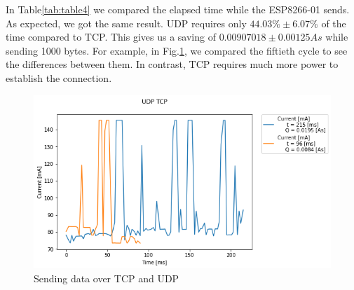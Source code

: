 In Table\ref{tab:table4} we compared the elapsed time while the ESP8266-01 sends.
As expected, we got the same result.
UDP requires only $44.03\% \pm 6.07\%$ of the time compared to TCP.
This gives us a saving of $0.00907018 \pm 0.00125 As$ while sending 1000 bytes.
For example, in Fig.\ref{fig:udp_tcp_s_m},
we compared the fiftieth cycle to see the differences between them.
In contrast, TCP requires much more power to establish the connection.
\begin{figure}[H]
    \centering
    \includegraphics[width = 1 \linewidth]{fig/udp_tcp/udp_tcp_s_m.png}
    \caption{Sending data over TCP and UDP}
    \label{fig:udp_tcp_s_m}
    \end{figure}